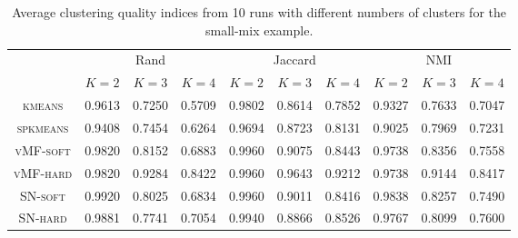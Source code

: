\documentclass[11pt]{article}
\begin{document}
\begin{table}[ht]
	\begin{center}
			\begin{tabular}{|c|c|c|c|c|c|c|c|c|c|}
			\hline
			\multirow{2}{*}{} & \multicolumn{3}{c|}{Rand} & \multicolumn{3}{c|}{Jaccard} & \multicolumn{3}{c|}{NMI} \\ \cline{2-10} 
			& $K=2$     & $K=3$    & $K=4$    & $K=2$      & $K=3$     & $K=4$     & $K=2$   & $K=3$   & $K=4$    \\ \hline
\textsc{kmeans} & 0.9613 & 0.7250 & 0.5709 & 0.9802 & 0.8614 & 0.7852 & 0.9327 & 0.7633 & 0.7047 \\ \hline
\textsc{spkmeans} & 0.9408 & 0.7454 & 0.6264 & 0.9694 & 0.8723 & 0.8131 & 0.9025 & 0.7969 & 0.7231 \\ \hline
\textsc{vMF-soft} & 0.9820 & 0.8152 & 0.6883 & 0.9960 & 0.9075 & 0.8443 & 0.9738 & 0.8356 & 0.7558 \\ \hline
\textsc{vMF-hard} & 0.9820 & 0.9284 & 0.8422 & 0.9960 & 0.9643 & 0.9212 & 0.9738 & 0.9144 & 0.8417 \\ \hline
\textsc{SN-soft} & 0.9920 & 0.8025 & 0.6834 & 0.9960 & 0.9011 & 0.8416 & 0.9838 & 0.8257 & 0.7490 \\ \hline
\textsc{SN-hard} & 0.9881 & 0.7741 & 0.7054 & 0.9940 & 0.8866 & 0.8526 & 0.9767 & 0.8099 & 0.7600 \\  \hline
		\end{tabular}
	\end{center}
	\caption{Average clustering quality indices from 10 runs with different numbers of clusters for the \textsf{small-mix} example.}
	\label{table:small_mix}
\end{table}
\end{document}
